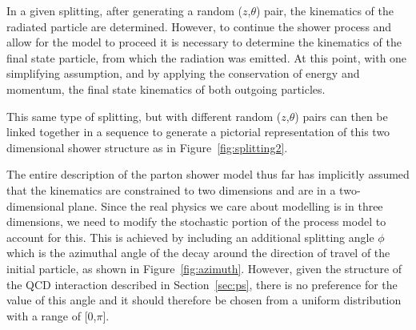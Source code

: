 \documentclass[UKenglish,texlive=2016]{\ATLASLATEXPATH atlasdoc}
\begin{document}
In a given splitting, after generating a random ($z$,$\theta$) pair, the kinematics of the radiated particle are determined.  However, to continue the shower process and allow for the model to proceed it is necessary to determine the kinematics of the final state particle, from which the radiation was emitted.  At this point, with one simplifying assumption, and by applying the conservation of energy and momentum, the final state kinematics of both outgoing particles.  

\begin{center}
\end{center}

This same type of splitting, but with different random ($z$,$\theta$) pairs can then be linked together in a sequence to generate a pictorial representation of this two dimensional shower structure as in Figure~\ref{fig:splitting2}.

\begin{center}
\end{center}

The entire description of the parton shower model thus far has implicitly assumed that the kinematics are constrained to two dimensions and are in a two-dimensional plane.  Since the real physics we care about modelling is in three dimensions, we need to modify the stochastic portion of the process model to account for this.  This is achieved by including an additional splitting angle $\phi$ which is the azimuthal angle of the decay around the direction of travel of the initial particle, as shown in Figure~\ref{fig:azimuth}.  However, given the structure of the QCD interaction described in Section~\ref{sec:ps}, there is no preference for the value of this angle and it should therefore be chosen from a uniform distribution with a  range of [0,$\pi$].  
\end{document}
